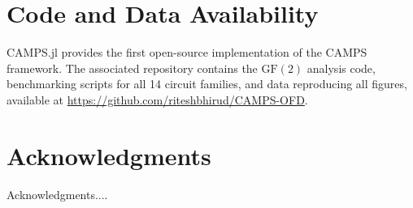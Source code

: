\documentclass[a4paper,twocolumn,11pt]{quantumarticle}
\begin{document}
\section*{Code and Data Availability}

CAMPS.jl provides the first open-source implementation of the CAMPS framework. The associated repository contains the $\mathrm{GF}(2)$ analysis code, benchmarking scripts for all 14 circuit families, and data reproducing all figures, available at \url{https://github.com/riteshbhirud/CAMPS-OFD}.

\section*{Acknowledgments}
Acknowledgments....


\end{document}
